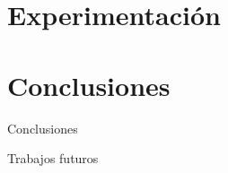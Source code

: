 \documentclass[11pt]{beamer}    %
\begin{document}
    \section{Experimentación}
    \begin{frame}{}

    \end{frame}
    \begin{frame}{}

    \end{frame}
    \begin{frame}{}

    \end{frame}
    \begin{frame}{}

    \end{frame}

    \section{Conclusiones}

    \begin{frame}{Conclusiones}

    \end{frame}

    \begin{frame}{Trabajos futuros}

    \end{frame}
\end{document}
